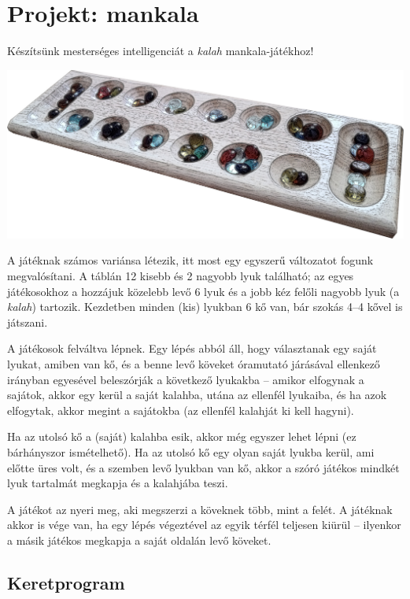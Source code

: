\section{Projekt: mankala}
Készítsünk mesterséges intelligenciát a \emph{kalah}
mankala-játékhoz!

\begin{center}
\includegraphics[width=\textwidth]{images/kalah.jpg}
\end{center}

A játéknak számos variánsa létezik, itt most egy
egyszerű változatot fogunk megvalósítani. A táblán
12 kisebb és 2 nagyobb lyuk található; az egyes
játékosokhoz a hozzájuk közelebb levő 6 lyuk és a
jobb kéz felőli nagyobb lyuk (a \emph{kalah})
tartozik. Kezdetben minden (kis) lyukban 6 kő van,
bár szokás 4--4 kővel is játszani.

A játékosok felváltva lépnek. Egy lépés abból áll,
hogy választanak egy saját lyukat, amiben van kő, és
a benne levő köveket óramutató járásával ellenkező
irányban egyesével beleszórják a következő lyukakba
-- amikor elfogynak a sajátok, akkor egy kerül a
saját kalahba, utána az ellenfél lyukaiba, és ha
azok elfogytak, akkor megint a sajátokba (az
ellenfél kalahját ki kell hagyni).

Ha az utolsó kő a (saját) kalahba esik, akkor még
egyszer lehet lépni (ez bárhányszor ismételhető). Ha
az utolsó kő egy olyan saját lyukba kerül, ami
előtte üres volt, és a szemben levő lyukban van kő,
akkor a szóró játékos mindkét lyuk tartalmát
megkapja és a kalahjába teszi.

A játékot az nyeri meg, aki megszerzi a köveknek
több, mint a felét. A játéknak akkor is vége van, ha
egy lépés végeztével az egyik térfél teljesen kiürül
-- ilyenkor a másik játékos megkapja a saját oldalán
levő köveket.

\subsection*{Keretprogram}

